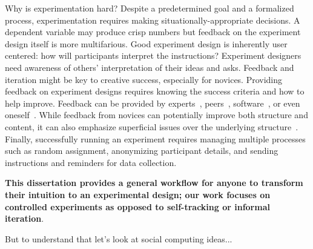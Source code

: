 Why is experimentation hard?  Despite a predetermined goal and a formalized process, experimentation
requires making situationally-appropriate decisions. A dependent variable may produce crisp
numbers but feedback on the experiment design itself is more multifarious. Good experiment
design is inherently user centered: how will participants interpret the instructions? Experiment
designers need awareness of others’ interpretation of their ideas and asks. Feedback and iteration
might be key to creative success, especially for novices. Providing feedback on experiment
designs requires knowing the success criteria and how to
help improve.  Feedback can be provided by experts~\cite{dow2012shepherding, schon1984reflective}, peers~\cite{Boud1995, Kulkarni2015b}, software~\cite{Dantoni2015, Head2017}, or even oneself~\cite{Boud1995,schon1984reflective}. While feedback from novices can
potentially improve both structure and content, it can also emphasize superficial issues over the
underlying structure~\cite{chi1981expertise}. Finally, successfully running an experiment
requires managing multiple processes such as random
assignment, anonymizing participant details, and sending
instructions and reminders for data collection.

\textbf{This dissertation provides a general workflow for anyone to transform their intuition to an experimental design; 
our work focuses on controlled experiments as opposed to self-tracking or informal iteration}.

But to understand that let's look at social computing ideas...

